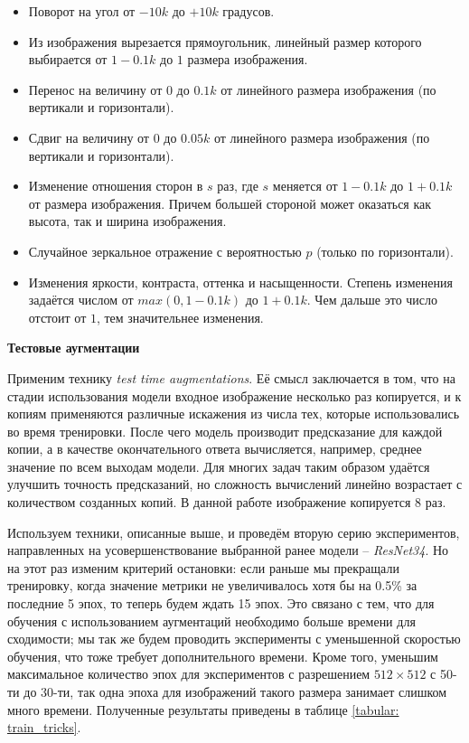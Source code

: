 \begin{itemize}

    \item Поворот на угол от $-10k$ до $+10k$ градусов.

    \item Из изображения вырезается прямоугольник, линейный размер
    которого выбирается от $1 - 0.1k$ до $1$ размера изображения.
    
    \item Перенос на величину от $0$ до $0.1k$ от линейного
    размера изображения (по вертикали и горизонтали).
    
    \item Сдвиг на величину от $0$ до $0.05k$ от линейного
    размера изображения
    (по вертикали и горизонтали).
    
    \item Изменение отношения сторон в $s$ раз, где $s$ меняется
    от $1 - 0.1k$ до $1 + 0.1k$ от размера изображения.
    Причем большей стороной может оказаться как высота,
    так и ширина изображения.
    
    \item Случайное зеркальное отражение с вероятностью $p$
    (только по горизонтали).
    
    \item Изменения яркости, контраста, оттенка и насыщенности.
    Степень изменения задаётся числом от
    $max(0, 1 - 0.1k)$ до $1 + 0.1k$. Чем дальше это число отстоит от
    $1$, тем значительнее изменения.
    
\end{itemize}
    
    
\indent
\indent
\textbf{Тестовые аугментации}

\indent
Применим технику \textit{test time augmentations}.
Её смысл заключается в том, что на стадии использования модели
входное изображение
несколько раз копируется, и к копиям применяются различные 
искажения из числа тех, которые использовались во время тренировки.
После чего модель производит предсказание для каждой
копии, а в качестве окончательного ответа вычисляется, например, 
среднее значение по всем выходам модели. Для многих задач таким образом
удаётся улучшить точность предсказаний,
но сложность вычислений линейно возрастает
с количеством созданных копий.
В данной работе изображение копируется 8 раз.


\bigbreak
\indent
\indent
Используем техники, описанные выше, и проведём вторую серию 
экспериментов, направленных на усовершенствование
 выбранной ранее модели --
\textit{ResNet34}. Но на этот раз изменим критерий остановки: если раньше мы 
прекращали тренировку, когда значение метрики не увеличивалось хотя бы 
на 0.5\% за последние 5 эпох, то теперь будем ждать 15 эпох. Это связано
с тем, что для обучения с использованием аугментаций необходимо
больше времени для сходимости; мы так же будем
проводить эксперименты с уменьшенной
скоростью обучения, что тоже требует дополнительного времени.
Кроме того, уменьшим максимальное количество эпох для экспериментов
с разрешением $512 \times 512$ с 50-ти до 30-ти, так одна эпоха 
для изображений такого размера занимает слишком много времени.
Полученные результаты приведены в таблице \ref{tabular: train_tricks}.


